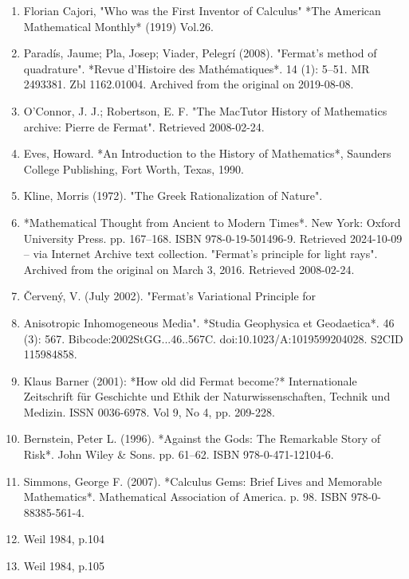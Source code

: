 \begin{enumerate}
\item Florian Cajori, "Who was the First Inventor of Calculus" *The American Mathematical Monthly* (1919) Vol.26.  
\item Paradís, Jaume; Pla, Josep; Viader, Pelegrí (2008). "Fermat's method of quadrature". *Revue d'Histoire des Mathématiques*. 14 (1): 5–51. MR 2493381. Zbl 1162.01004. Archived from the original on 2019-08-08.  
\item O'Connor, J. J.; Robertson, E. F. "The MacTutor History of Mathematics archive: Pierre de Fermat". Retrieved 2008-02-24.  
\item Eves, Howard. *An Introduction to the History of Mathematics*, Saunders College Publishing, Fort Worth, Texas, 1990.  
\item Kline, Morris (1972). "The Greek Rationalization of Nature". \item *Mathematical Thought from Ancient to Modern Times*. New York: Oxford University Press. pp. 167–168. ISBN 978-0-19-501496-9. Retrieved 2024-10-09 – via Internet Archive text collection.  
"Fermat's principle for light rays". Archived from the original on March 3, 2016. Retrieved 2008-02-24.  
\item Červený, V. (July 2002). "Fermat's Variational Principle for \item Anisotropic Inhomogeneous Media". *Studia Geophysica et Geodaetica*. 46 (3): 567. Bibcode:2002StGG...46..567C. doi:10.1023/A:1019599204028. S2CID 115984858.  
\item Klaus Barner (2001): *How old did Fermat become?* Internationale Zeitschrift für Geschichte und Ethik der Naturwissenschaften, Technik und Medizin. ISSN 0036-6978. Vol 9, No 4, pp. 209-228.  
\item Bernstein, Peter L. (1996). *Against the Gods: The Remarkable Story of Risk*. John Wiley & Sons. pp. 61–62. ISBN 978-0-471-12104-6.  
\item Simmons, George F. (2007). *Calculus Gems: Brief Lives and Memorable Mathematics*. Mathematical Association of America. p. 98. ISBN 978-0-88385-561-4.  
\item Weil 1984, p.104  
\item Weil 1984, p.105
\end{enumerate}